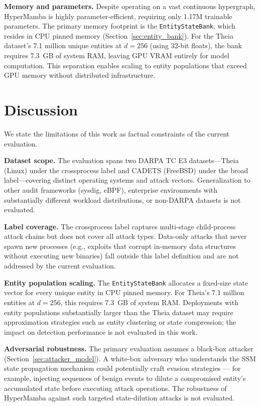 \documentclass[letterpaper,twocolumn,10pt]{article}
\begin{document}
\textbf{Memory and parameters.} Despite operating on a vast continuous hypergraph, HyperMamba is highly parameter-efficient, requiring only 1.17M trainable parameters. The primary memory footprint is the \texttt{EntityStateBank}, which resides in CPU pinned memory (Section~\ref{sec:entity_bank}). For the Theia dataset's 7.1 million unique entities at $d=256$ (using 32-bit floats), the bank requires 7.3~GB of system RAM, leaving GPU VRAM entirely for model computation. This separation enables scaling to entity populations that exceed GPU memory without distributed infrastructure.

\section{Discussion}
\label{sec:discussion}

We state the limitations of this work as factual constraints of the current evaluation.

\textbf{Dataset scope.} The evaluation spans two DARPA TC E3 datasets---Theia (Linux) under the crossprocess label and CADETS (FreeBSD) under the broad label---covering distinct operating systems and attack vectors. Generalization to other audit frameworks (sysdig, eBPF), enterprise environments with substantially different workload distributions, or non-DARPA datasets is not evaluated.

\textbf{Label coverage.} The crossprocess label captures multi-stage child-process attack chains but does not cover all attack types. Data-only attacks that never spawn new processes (e.g., exploits that corrupt in-memory data structures without executing new binaries) fall outside this label definition and are not addressed by the current evaluation.

\textbf{Entity population scaling.} The \texttt{EntityStateBank} allocates a fixed-size state vector for every unique entity in CPU pinned memory. For Theia's 7.1 million entities at $d=256$, this requires 7.3~GB of system RAM. Deployments with entity populations substantially larger than the Theia dataset may require approximation strategies such as entity clustering or state compression; the impact on detection performance is not evaluated in this work.

\textbf{Adversarial robustness.} The primary evaluation assumes a black-box attacker (Section~\ref{sec:attacker_model}). A white-box adversary who understands the SSM state propagation mechanism could potentially craft evasion strategies --- for example, injecting sequences of benign events to dilute a compromised entity's accumulated state before executing attack operations. The robustness of HyperMamba against such targeted state-dilution attacks is not evaluated.
\end{document}
